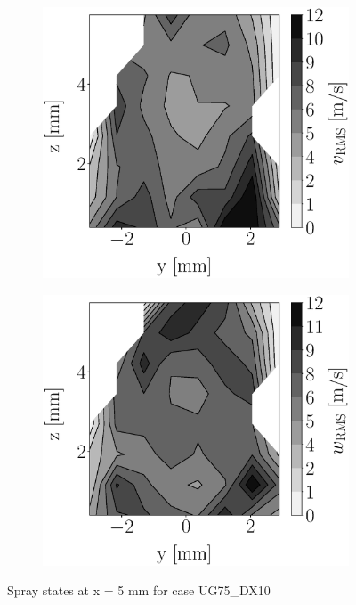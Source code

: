 \begin{figure}[h!]
\begin{subfigure}[b]{0.22\textwidth}
\end{subfigure}
   \hspace{0.17in}
\begin{subfigure}[b]{0.22\textwidth}
	\centering
   \includegraphics[scale=0.17]{./part2_developments/figures_ch5_resolved_JICF/injectors_SLI/uG75_dx10_x05_uy_rms_map.eps}
\end{subfigure}
   \hspace{0.17in}
\begin{subfigure}[b]{0.22\textwidth}
	\centering
   \includegraphics[scale=0.17]{./part2_developments/figures_ch5_resolved_JICF/injectors_SLI/uG75_dx10_x05_uz_rms_map.eps}
\end{subfigure}
\caption{Spray states at x = 5 mm for case UG75\_DX10}
\label{fig:injectors_sli_uG75_dx10_x05}
\end{figure}


